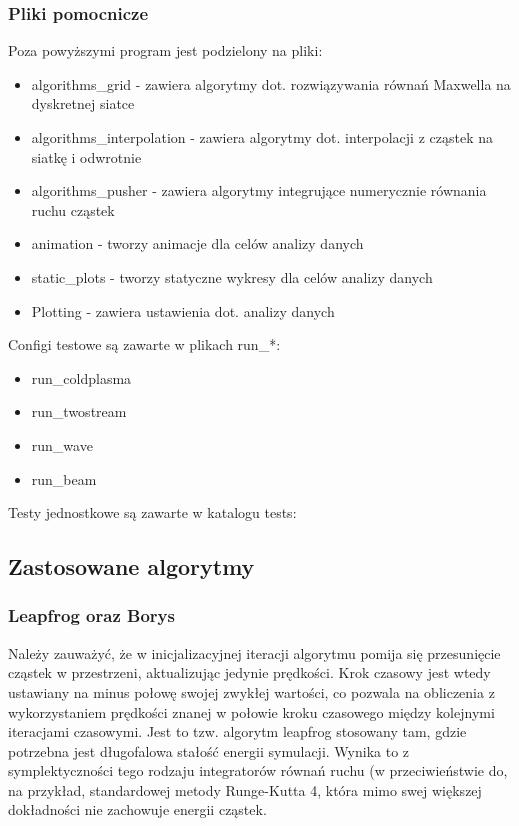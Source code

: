    \subsubsection{Pliki pomocnicze}
    Poza powyższymi program jest podzielony na pliki:
    \begin{itemize}
        \item algorithms\_grid - zawiera algorytmy dot. rozwiązywania równań Maxwella na dyskretnej siatce
        \item algorithms\_interpolation - zawiera algorytmy dot. interpolacji z cząstek na siatkę i odwrotnie
        \item algorithms\_pusher - zawiera algorytmy integrujące numerycznie równania ruchu cząstek
        \item animation - tworzy animacje dla celów analizy danych
        \item static\_plots - tworzy statyczne wykresy dla celów analizy danych
        \item Plotting - zawiera ustawienia dot. analizy danych %
    \end{itemize}

    Configi testowe są zawarte w plikach run\_*: %
    \begin{itemize}
        \item run\_coldplasma
        \item run\_twostream
        \item run\_wave
        \item run\_beam
    \end{itemize}

    Testy jednostkowe są zawarte w katalogu tests:

    \subsection{Zastosowane algorytmy}

    \subsubsection{Leapfrog oraz Borys} %
    Należy zauważyć, że w inicjalizacyjnej iteracji algorytmu pomija się przesunięcie cząstek w przestrzeni, aktualizując jedynie
    prędkości. Krok czasowy jest wtedy ustawiany na minus połowę swojej zwykłej wartości, co pozwala na obliczenia
    z wykorzystaniem prędkości znanej w połowie kroku czasowego między kolejnymi iteracjami czasowymi. Jest to tzw. algorytm
    leapfrog %
    stosowany tam, gdzie potrzebna jest długofalowa stałość energii symulacji. Wynika to z symplektyczności %
    tego rodzaju integratorów równań ruchu (w przeciwieństwie do, na przykład, standardowej metody Runge-Kutta 4, która
    mimo swej większej dokładności nie zachowuje energii cząstek.

